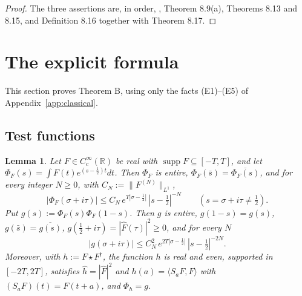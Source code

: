\documentclass[11pt]{amsart}
\newtheorem{lemma}[theorem]{Lemma}
\theoremstyle{definition}
\theoremstyle{remark}
\newcommand{\R}{\mathbb R}
\newcommand{\supp}{\operatorname{supp}}
\begin{document}
\begin{proof}
The three assertions are, in order, \cite{P43}, Theorem 8.9(a),
Theorems 8.13 and 8.15, and Definition 8.16 together with
Theorem 8.17.
\end{proof}

\section{The explicit formula}
\label{sec:EF}

This section proves Theorem B, using only the facts (E1)--(E5) of
Appendix~\ref{app:classical}.

\subsection{Test functions}

\begin{lemma}
\label{lem:testfn}
Let $F\in C_c^\infty(\R)$ be real with $\supp F\subseteq[-T,T]$, and let
$\Phi_F(s)=\int F(t)e^{(s-\frac12)t}dt$.  Then $\Phi_F$ is entire,
$\Phi_F(\bar s)=\overline{\Phi_F(s)}$, and for every integer $N\ge0$, with
$C_N:=\|F^{(N)}\|_{L^1}$,
\begin{equation}
  |\Phi_F(\sigma+i\tau)|\le C_N\,e^{T|\sigma-\frac12|}\,|s-\tfrac12|^{-N}
  \qquad(s=\sigma+i\tau\ne\tfrac12).
\tag{8.1}
\end{equation}
Put $g(s):=\Phi_F(s)\Phi_F(1-s)$.  Then $g$ is entire, $g(1-s)=g(s)$,
$g(\bar s)=\overline{g(s)}$, $g(\tfrac12+i\tau)=|\hat F(\tau)|^2\ge0$, and for
every $N$
\begin{equation}
  |g(\sigma+i\tau)|\le C_N^2\,e^{2T|\sigma-\frac12|}\,|s-\tfrac12|^{-2N}.
\tag{8.2}
\end{equation}
Moreover, with $h:=F\star F^\dagger$, the function $h$ is real and even,
supported in $[-2T,2T]$, satisfies $\hat h=|\hat F|^2$ and
$h(a)=\langle S_aF,F\rangle$ with $(S_aF)(t)=F(t+a)$, and $\Phi_h=g$.
\end{lemma}
\end{document}
